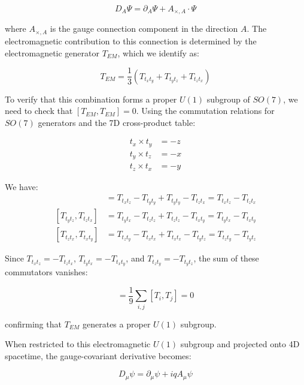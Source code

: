 \documentclass{article}
\begin{document}
\begin{equation}
D_A \Psi = \partial_A \Psi + A_{\times, A} \cdot \Psi
\end{equation}

where $A_{\times, A}$ is the gauge connection component in the direction $A$. The electromagnetic contribution to this connection is determined by the electromagnetic generator $T_{EM}$, which we identify as:

\begin{equation}
T_{EM} = \frac{1}{3}(T_{t_x t_y} + T_{t_y t_z} + T_{t_z t_x})
\end{equation}

To verify that this combination forms a proper $U(1)$ subgroup of $SO(7)$, we need to check that $[T_{EM}, T_{EM}] = 0$. Using the commutation relations for $SO(7)$ generators and the 7D cross-product table:

\begin{align}
t_x \times t_y &= -z \\
t_y \times t_z &= -x \\
t_z \times t_x &= -y
\end{align}

We have:
\begin{align}
[T_{t_x t_y}, T_{t_y t_z}] &= T_{t_x t_z} - T_{t_y t_y} + T_{t_y t_y} - T_{t_z t_x} = T_{t_x t_z} - T_{t_z t_x} \\
[T_{t_y t_z}, T_{t_z t_x}] &= T_{t_y t_x} - T_{t_z t_z} + T_{t_z t_z} - T_{t_x t_y} = T_{t_y t_x} - T_{t_x t_y} \\
[T_{t_z t_x}, T_{t_x t_y}] &= T_{t_z t_y} - T_{t_x t_x} + T_{t_x t_x} - T_{t_y t_z} = T_{t_z t_y} - T_{t_y t_z}
\end{align}

Since $T_{t_x t_z} = -T_{t_z t_x}$, $T_{t_y t_x} = -T_{t_x t_y}$, and $T_{t_z t_y} = -T_{t_y t_z}$, the sum of these commutators vanishes:

\begin{equation}
[T_{EM}, T_{EM}] = \frac{1}{9}\sum_{i,j}[T_i, T_j] = 0
\end{equation}

confirming that $T_{EM}$ generates a proper $U(1)$ subgroup.

When restricted to this electromagnetic $U(1)$ subgroup and projected onto 4D spacetime, the gauge-covariant derivative becomes:

\begin{equation}
D_\mu \psi = \partial_\mu \psi + i q A_\mu \psi
\end{equation}
\end{document}
